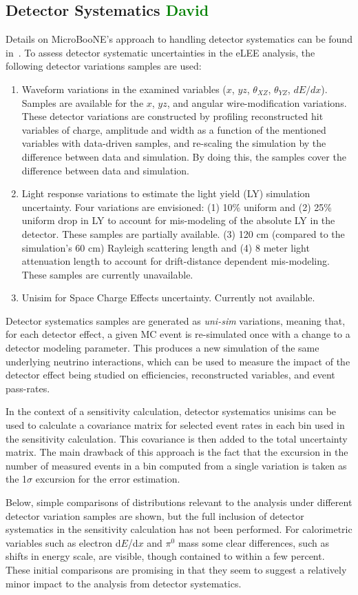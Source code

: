 \documentclass[a4paper]{article}
\begin{document}
\subsection{Detector Systematics \textcolor{green}{David}}
Details on MicroBooNE's approach to handling detector systematics can be found in~\cite{bib:detsyssupportnote}. To assess detector systematic uncertainties in the eLEE analysis, the following detector variations samples are used:
\begin{enumerate}
    \item Waveform variations in the examined variables ($x$, $yz$, $\theta_{XZ}$, $\theta_{YZ}$, $dE/dx$). Samples are available for the $x$, $yz$, and angular wire-modification variations. These detector variations are constructed by profiling reconstructed hit variables of charge, amplitude and width as a function of the mentioned variables with data-driven samples, and re-scaling the simulation by the difference between data and simulation. By doing this, the samples cover the difference between data and simulation. 
    \item Light response variations to estimate the light yield (LY) simulation uncertainty. Four variations are envisioned: (1) 10\% uniform and (2) 25\% uniform drop in LY to account for mis-modeling of the absolute LY in the detector. These samples are partially available. (3) 120 cm (compared to the simulation's 60 cm) Rayleigh scattering length and (4) 8 meter light attenuation length to account for drift-distance dependent mis-modeling. These samples are currently unavailable.
    \item Unisim for Space Charge Effects uncertainty. Currently not available.
\end{enumerate}
\par Detector systematics samples are generated as \emph{uni-sim} variations, meaning that, for each detector effect, a given MC event is re-simulated once with a change to a detector modeling parameter. This produces a new simulation of the same underlying neutrino interactions, which can be used to measure the impact of the detector effect being studied on efficiencies, reconstructed variables, and event pass-rates.
\par In the context of a sensitivity calculation, detector systematics unisims can be used to calculate a covariance matrix for selected event rates in each bin used in the sensitivity calculation. This covariance is then added to the total uncertainty matrix. The main drawback of this approach is the fact that the excursion in the number of measured events in a bin computed from a single variation is taken as the 1$\sigma$ excursion for the error estimation.
\par Below, simple comparisons of distributions relevant to the analysis under different detector variation samples are shown, but the full inclusion of detector systematics in the sensitivity calculation has not been performed. For calorimetric variables such as electron d$E$/d$x$ and $\pi^0$ mass some clear differences, such as shifts in energy scale, are visible, though contained to within a few percent. These initial comparisons are promising in that they seem to suggest a relatively minor impact to the analysis from detector systematics. 
\end{document}
